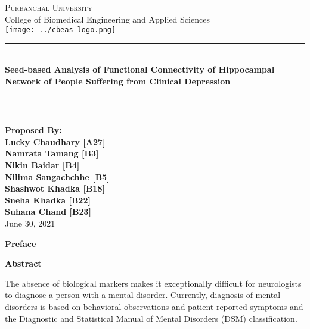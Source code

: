 \documentclass{article}
\newcommand{\HRule}{\rule{\linewidth}{0.1mm}}
\begin{document}
\begin{titlepage}
\begin{center}

  \textsc{\huge Purbanchal University}\\[1cm]
  {\huge College of Biomedical Engineering and Applied Sciences}\\[1cm]
  \texttt{[image: ../cbeas-logo.png]}\\[1cm]

  \color{red} \HRule \\[0.4cm] \color{black}
  {\huge \bfseries Seed-based Analysis of Functional Connectivity of
  Hippocampal Network of People Suffering from Clinical Depression}\\[0.2cm]
  \color{red} \HRule \\[2cm] \color{black}

\textbf{
  \Large Proposed By:\\[0.2cm]
\Large Lucky Chaudhary [A27]\\ Namrata Tamang [B3]\\ Nikin Baidar
  [B4]\\ Nilima Sangachchhe [B5]\\ Shashwot Khadka [B18]\\ Sneha
  Khadka [B22]\\Suhana Chand [B23]\\[1cm]}
\vfill
{\Large June 30, 2021}

\end{center}
\end{titlepage}

\clearpage
\setcounter{page}{1}

\begin{center}
 \textbf{\large Preface}
\end{center}
\newpage

\begin{center}
  \textbf{\large Abstract}
\end{center}

  The absence of biological markers makes it exceptionally difficult
  for neurologists to diagnose a person with a mental disorder.
  Currently, diagnosis of mental disorders is based on behavioral
  observations and patient-reported symptoms and the Diagnostic and
  Statistical Manual of Mental Disorders (DSM) classification.
\end{document}
